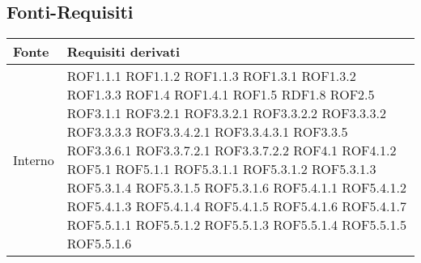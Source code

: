 \subsection{Fonti-Requisiti} %
\label{ssub:fonti_requisiti}
\begin{center}
\def\arraystretch{1.5}
\bgroup
\begin{longtable}{| p{4cm} | p{4cm} |}
\hline
\textbf{Fonte} & \textbf{Requisiti derivati} \\
\hline
Interno & ROF1.1.1 \newline ROF1.1.2 \newline ROF1.1.3 \newline ROF1.3.1 \newline ROF1.3.2 \newline ROF1.3.3 \newline ROF1.4 \newline ROF1.4.1 \newline ROF1.5 \newline RDF1.8 \newline ROF2.5 \newline ROF3.1.1 \newline ROF3.2.1 \newline ROF3.3.2.1 \newline ROF3.3.2.2 \newline ROF3.3.3.2 \newline ROF3.3.3.3 \newline ROF3.3.4.2.1 \newline ROF3.3.4.3.1 \newline ROF3.3.5 \newline ROF3.3.6.1 \newline ROF3.3.7.2.1 \newline ROF3.3.7.2.2 \newline ROF4.1 \newline ROF4.1.2 \newline ROF5.1 \newline ROF5.1.1 \newline ROF5.3.1.1 \newline ROF5.3.1.2 \newline ROF5.3.1.3 \newline ROF5.3.1.4 \newline ROF5.3.1.5 \newline ROF5.3.1.6 \newline ROF5.4.1.1 \newline ROF5.4.1.2 \newline ROF5.4.1.3 \newline ROF5.4.1.4 \newline ROF5.4.1.5 \newline ROF5.4.1.6 \newline ROF5.4.1.7 \newline ROF5.5.1.1 \newline ROF5.5.1.2 \newline ROF5.5.1.3 \newline ROF5.5.1.4 \newline ROF5.5.1.5 \newline ROF5.5.1.6 \\

\end{longtable}
\end{center}
